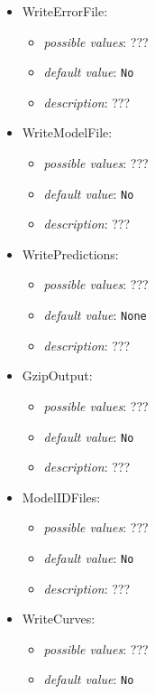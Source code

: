 \documentclass{article}
\begin{document}
\begin{itemize}
    \item WriteErrorFile:
           \begin{itemize}
                \item \emph{possible values}: ???
                \item \emph{default value}: \texttt{No}
                \item \emph{description}: ???
           \end{itemize}
    \item WriteModelFile:
           \begin{itemize}
                \item \emph{possible values}: ???
                \item \emph{default value}: \texttt{No}
                \item \emph{description}: ???
           \end{itemize}
    \item WritePredictions:
           \begin{itemize}
                \item \emph{possible values}: ???
                \item \emph{default value}: \texttt{{None}}
                \item \emph{description}: ???
           \end{itemize}
    \item GzipOutput:
           \begin{itemize}
                \item \emph{possible values}: ???
                \item \emph{default value}: \texttt{No}
                \item \emph{description}: ???
           \end{itemize}
    \item ModelIDFiles:
           \begin{itemize}
                \item \emph{possible values}: ???
                \item \emph{default value}: \texttt{No}
                \item \emph{description}: ???
           \end{itemize}
    \item WriteCurves:
           \begin{itemize}
                \item \emph{possible values}: ???
                \item \emph{default value}: \texttt{No}

\end{itemize}
\end{itemize}
\end{document}

